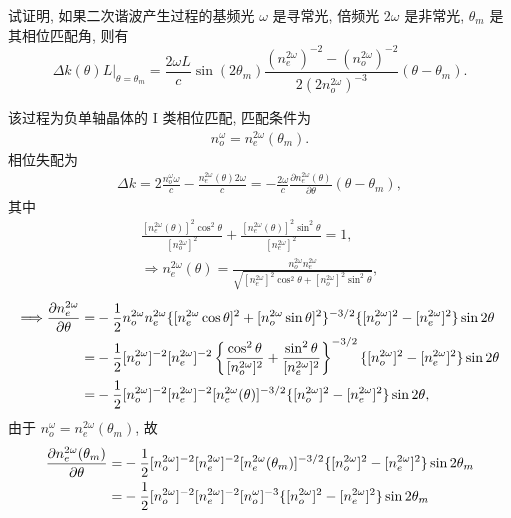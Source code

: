 \documentclass{assignment}
\begin{document}
\begin{prob}
    试证明, 如果二次谐波产生过程的基频光 $\omega$ 是寻常光, 倍频光 $2\omega$ 是非常光, $\theta_m$ 是其相位匹配角, 则有
    \[
        \Delta k(\theta)L|_{\theta=\theta_m}=\frac{2\omega L}{c}\sin(2\theta_m)\frac{(n_e^{2\omega})^{-2}-(n_o^{2\omega})^{-2}}{2(2n_o^{2\omega})^{-3}}(\theta-\theta_m).
    \]
\end{prob}
\begin{pf}
    该过程为负单轴晶体的 I 类相位匹配, 匹配条件为
    \begin{align}
        n_o^{\omega}=n_e^{2\omega}(\theta_m).
    \end{align}
    相位失配为
    \begin{align}
        \Delta k=2\frac{n_o^{\omega}\omega}{c}-\frac{n_e^{2\omega}(\theta)2\omega}{c}=-\frac{2\omega}{c}\frac{\partial n_e^{2\omega}(\theta)}{\partial\theta}(\theta-\theta_m),
    \end{align}
    其中
    \begin{gather}
        \frac{[n_e^{2\omega}(\theta)]^2\cos^2\theta}{[n_o^{2\omega}]^2}+\frac{[n_e^{2\omega}(\theta)]^2\sin^2\theta}{[n_e^{2\omega}]^2}=1,\\
        \Longrightarrow n_e^{2\omega}(\theta)=\frac{n_o^{2\omega}n_e^{2\omega}}{\sqrt{[n_e^{2\omega}]^2\cos^2\theta+[n_o^{2\omega}]^2\sin^2\theta}},
    \end{gather}
    \begin{align}
        \notag\Longrightarrow\frac{\partial n_e^{2\omega}}{\partial\theta}=&-\frac{1}{2}n_o^{2\omega}n_e^{2\omega}\{[n_e^{2\omega}\cos\theta]^2+[n_o^{2\omega}\sin\theta]^2\}^{-3/2}\{[n_o^{2\omega}]^2-[n_e^{2\omega}]^2\}\sin 2\theta\\
        \notag=&-\frac{1}{2}[n_o^{2\omega}]^{-2}[n_e^{2\omega}]^{-2}\left\{\frac{\cos^2\theta}{[n_o^{2\omega}]^2}+\frac{\sin^2\theta}{[n_e^{2\omega}]^2}\right\}^{-3/2}\{[n_o^{2\omega}]^2-[n_e^{2\omega}]^2\}\sin 2\theta\\
        \notag=&-\frac{1}{2}[n_o^{2\omega}]^{-2}[n_e^{2\omega}]^{-2}[n_e^{2\omega}(\theta)]^{-3/2}\{[n_o^{2\omega}]^2-[n_e^{2\omega}]^2\}\sin 2\theta,
    \end{align}
    由于 $n_o^{\omega}=n_e^{2\omega}(\theta_m)$, 故
    \begin{align}
        \notag\frac{\partial n_e^{2\omega}(\theta_m)}{\partial\theta}=&-\frac{1}{2}[n_o^{2\omega}]^{-2}[n_e^{2\omega}]^{-2}[n_e^{2\omega}(\theta_m)]^{-3/2}\{[n_o^{2\omega}]^2-[n_e^{2\omega}]^2\}\sin 2\theta_m\\
        \notag=&-\frac{1}{2}[n_o^{2\omega}]^{-2}[n_e^{2\omega}]^{-2}[n_o^{\omega}]^{-3}\{[n_o^{2\omega}]^2-[n_e^{2\omega}]^2\}\sin 2\theta_m\\

\end{align}
\end{pf}
\end{document}
